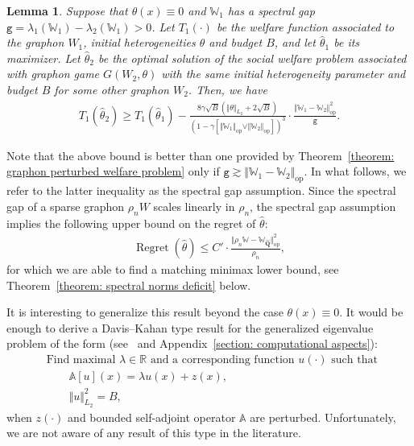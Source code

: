 \documentclass[11pt]{article}
\newcommand{\bbR}{\mathbb{R}}
\newcommand{\op}{\mathrm{op}}
\newcommand{\bQ}{\bm{Q}}
\newcommand{\bbW}{\mathbb{W}}
\newcommand{\bbA}{\mathbb{A}}
\newcommand{\<}{\langle}
\renewcommand{\>}{\rangle}
\newcommand{\regret}{\operatorname{Regret}}
\newcommand{\ttg}{\mathtt{g}}
\theoremstyle{plain}
\newtheorem{lemma}{Lemma}
\theoremstyle{definition}
\theoremstyle{remark}
\begin{document}
{\begin{lemma}
\label{lemma: regret upper bound spectral gap}
Suppose that $\theta(x) \equiv 0$ and $\bbW_1$ has a spectral gap $\ttg = \lambda_1(\bbW_1) - \lambda_2(\bbW_1) > 0$. Let $T_1(\cdot)$ be the welfare function associated to the graphon $ W_1$, initial heterogeneities $\theta$ and budget $B$, and let $\hat{\theta}_1$ be its maximizer. Let $\hat{\theta}_2$ be the optimal solution of the social welfare problem associated with graphon game $G( W_{2}, \theta)$ with the same initial heterogeneity parameter and budget $B$ for some other graphon $W_2$. Then, we have
\begin{align*}
    T_1(\hat{\theta}_2) \ge T_1(\hat{\theta}_1) - \frac{8 \gamma \sqrt{B} (\Vert \theta \Vert_{L_2} + 2 \sqrt{B})}{(1 - \gamma [\Vert \bbW_1 \Vert_{\op} \vee \Vert \bbW_  2 \Vert_{\op}])^3} \cdot \frac{\Vert \bbW_1 - \bbW_2 \Vert_{\op}^2}{\ttg}.
\end{align*}
\end{lemma}

Note that the above bound is better than one provided by Theorem~\ref{theorem: graphon perturbed welfare problem} only if $\ttg \gtrsim \Vert \bbW_1 - \bbW_2 \Vert_{\op}$. In what follows, we refer to the latter inequality as the spectral gap assumption. Since the spectral gap of a sparse graphon $\rho_n W$ scales linearly in $\rho_n$, the spectral gap assumption implies the following upper bound on the regret of $\widehat{\theta}$:
\begin{align}
    \regret(\widehat{\theta}) \le C' \cdot  \frac{\Vert \rho_n \bbW - \bbW_{\widehat{\bQ}} \Vert_{\op}^2}{\rho_n}, \label{eq: regret squared bound using spectral gap}
\end{align}
for which we are able to find a matching minimax lower bound, see Theorem~\ref{theorem: spectral norms deficit} below.

It is interesting to generalize this result beyond the case $\theta(x) \equiv 0$. It would be enough to derive a Davis--Kahan type result for the generalized eigenvalue problem of the form (see~\citep{gander1989constrained} and Appendix~\ref{section: computational aspects}):
\begin{align*}
    &\text{Find maximal } \lambda \in \bbR \text{ and a corresponding function $u(\cdot)$ such that } \\
    & \qquad  \bbA[u](x) = \lambda u(x) + z(x), \\
    & \qquad \Vert u \Vert_{L_2}^2 = B, 
\end{align*}
when $z(\cdot)$ and bounded self-adjoint operator $\bbA$ are perturbed. Unfortunately, we are not aware of any result of this type in the literature.


}
\end{document}
